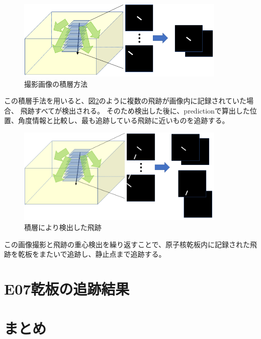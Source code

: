 \documentclass[12pt,a4paper]{jarticle}
\begin{document}
\begin{figure}[htbp]
  \centering
     \includegraphics[width=100mm]{sekisou_step3.png}
  \caption{撮影画像の積層方法\label{fig:sekisou_step3}}
\end{figure}
\par
この積層手法を用いると、図\ref{fig:sekisou_step4}のように複数の飛跡が画像内に記録されていた場合、
飛跡すべてが検出される。
そのため検出した後に、predictionで算出した位置、角度情報と比較し、最も追跡している飛跡に近いものを追跡する。
\begin{figure}[htbp]
  \centering
     \includegraphics[width=100mm]{sekisou_step4.png}
  \caption{積層により検出した飛跡\label{fig:sekisou_step4}}
\end{figure}
\par
この画像撮影と飛跡の重心検出を繰り返すことで、原子核乾板内に記録された飛跡を乾板をまたいで追跡し、静止点まで追跡する。






\newpage
\section{E07乾板の追跡結果}

\newpage
\section{まとめ}
\end{document}
